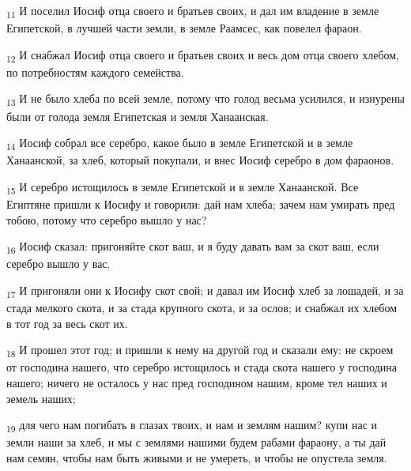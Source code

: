 \begin{tcolorbox}
\textsubscript{11} И поселил Иосиф отца своего и братьев своих, и дал им владение в земле Египетской, в лучшей части земли, в земле Раамсес, как повелел фараон.
\end{tcolorbox}
\begin{tcolorbox}
\textsubscript{12} И снабжал Иосиф отца своего и братьев своих и весь дом отца своего хлебом, по потребностям каждого семейства.
\end{tcolorbox}
\begin{tcolorbox}
\textsubscript{13} И не было хлеба по всей земле, потому что голод весьма усилился, и изнурены были от голода земля Египетская и земля Ханаанская.
\end{tcolorbox}
\begin{tcolorbox}
\textsubscript{14} Иосиф собрал все серебро, какое было в земле Египетской и в земле Ханаанской, за хлеб, который покупали, и внес Иосиф серебро в дом фараонов.
\end{tcolorbox}
\begin{tcolorbox}
\textsubscript{15} И серебро истощилось в земле Египетской и в земле Ханаанской. Все Египтяне пришли к Иосифу и говорили: дай нам хлеба; зачем нам умирать пред тобою, потому что серебро вышло у нас?
\end{tcolorbox}
\begin{tcolorbox}
\textsubscript{16} Иосиф сказал: пригоняйте скот ваш, и я буду давать вам за скот ваш, если серебро вышло у вас.
\end{tcolorbox}
\begin{tcolorbox}
\textsubscript{17} И пригоняли они к Иосифу скот свой; и давал им Иосиф хлеб за лошадей, и за стада мелкого скота, и за стада крупного скота, и за ослов; и снабжал их хлебом в тот год за весь скот их.
\end{tcolorbox}
\begin{tcolorbox}
\textsubscript{18} И прошел этот год; и пришли к нему на другой год и сказали ему: не скроем от господина нашего, что серебро истощилось и стада скота нашего у господина нашего; ничего не осталось у нас пред господином нашим, кроме тел наших и земель наших;
\end{tcolorbox}
\begin{tcolorbox}
\textsubscript{19} для чего нам погибать в глазах твоих, и нам и землям нашим? купи нас и земли наши за хлеб, и мы с землями нашими будем рабами фараону, а ты дай нам семян, чтобы нам быть живыми и не умереть, и чтобы не опустела земля.
\end{tcolorbox}
